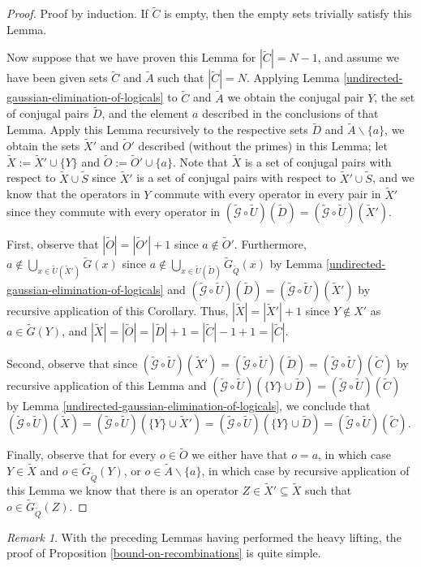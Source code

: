 \documentclass[12pt]{amsbook}
\theoremstyle{plain}
\theoremstyle{definition}
\theoremstyle{remark}
\newtheorem{remark}{Remark}
\newcommand{\set}{\tilde}
\newcommand{\genfun}{\tilde{\mathcal{G}}}
\begin{document}
\begin{proof}
Proof by induction.  If $\set C$ is empty, then the empty sets trivially satisfy this Lemma.

Now suppose that we have proven this Lemma for $|\set C|=N-1$, and assume we have been given sets $\set C$ and $\set A$ such that $|\set C|=N$.  Applying Lemma \ref{undirected-gaussian-elimination-of-logicals} to $\set C$ and $\set A$ we obtain the conjugal pair $Y$,  the set of conjugal pairs $\set D$, and the element $a$ described in the conclusions of that Lemma.  Apply this Lemma recursively to the respective sets $\set D$ and $\set A\backslash\{a\}$, we obtain the sets $\set X'$ and $\set O'$ described (without the primes) in this Lemma; let $\set X := \set X'\cup\{Y\}$ and $\set O:=\set O'\cup\{a\}$.  Note that $\set X$ is a set of conjugal pairs with respect to $\set X\cup\set S$ since $\set X'$ is a set of conjugal pairs with respect to $\set X'\cup\set S$, and we know that the operators in $Y$ commute with every operator in every pair in $\set X'$ since they commute with every operator in $(\genfun\circ\set U)(\set D)=(\genfun\circ\set U)(\set X')$.

First, observe that $|\set O|=|\set O'|+1$ since $a\notin \set O'$.  Furthermore, $a\notin \bigcup_{x\in \set U(\set X')} \set G(x)$ since $a\notin \bigcup_{x\in \set U(\set D)} \set G_{\set Q}(x)$ by Lemma \ref{undirected-gaussian-elimination-of-logicals} and $(\genfun\circ\set U)(\set D)=(\genfun\circ\set U)(\set X')$ by recursive application of this Corollary.  Thus, $|\set X|=|\set X'|+1$ since $Y\notin X'$ as $a\in\set G(Y)$, and $|\set X|=|\set O|=|\set D|+1=|\set C|-1+1=|\set C|$.

Second, observe that since $(\genfun\circ\set U)(\set X')=(\genfun\circ\set U)(\set D)=(\genfun\circ\set U)(\set C)$ by recursive application of this Lemma and $(\genfun\circ\set U)(\{Y\}\cup\set D)=(\genfun\circ\set U)(\set C)$ by Lemma \ref{undirected-gaussian-elimination-of-logicals}, we conclude that $(\genfun\circ\set U)(\set X) = (\genfun\circ\set U)(\{Y\}\cup\set X') = (\genfun\circ\set U)(\{Y\}\cup\set D) = (\genfun\circ\set U)(\set C)$.

Finally, observe that for every $o\in\set O$ we either have that $o=a$, in which case $Y\in\set X$ and $o\in\set G_{\set Q}(Y)$, or $o\in \set A\backslash\{a\}$, in which case by recursive application of this Lemma we know that there is an operator $Z\in \set X'\subseteq \set X$ such that $o\in\set G_{\set Q}(Z)$.
\end{proof}
\begin{remark}
With the preceding Lemmas having performed the heavy lifting, the proof of Proposition \ref{bound-on-recombinations} is quite simple.
\end{remark}
\end{document}
